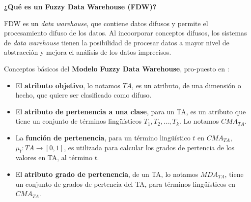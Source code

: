 \documentclass{fancyslides}
\begin{document}
\begin{frame}
\misc
{
\textbf{¿Qué es un Fuzzy Data Warehouse (FDW)?}
\newline

\justifying FDW es un \textit{data warehouse}, que contiene datos difusos y permite el procesamiento difuso de los datos. Al incoorporar conceptos difusos, los sistemas de \textit{data warehouse} tienen la posibilidad de procesar datos a mayor nivel de abstracción y mejora el análisis de los datos imprecisos.
}
\end{frame}


\begin{frame}
\misc
{
\justifying Conceptos básicos del \textbf{Modelo Fuzzy Data Warehouse}, pro-puesto en \cite{Fasel14}:

\begin{itemize}

  \item \justifying El \textbf{atributo objetivo}, lo notamos $TA$, es un atributo, de una dimensión o hecho, que quiere ser clasificado como difuso.

  \item \justifying El \textbf{atributo de pertenencia a una clase}, para un TA, es un atributo que tiene un conjunto de términos lingüísticos $T_{1},T_{2}, \ldots , T_{k}$. Lo notamos $CMA_{TA}$.
\end{itemize}
}
\end{frame}


\begin{frame}
\misc
{
\begin{itemize}

  \item \justifying La \textbf{función de pertenencia}, para un término lingüístico $t$ en $CMA_{TA}$, $\mu_{t} : TA \rightarrow [0,1]$,
  es utilizada para calcular los grados de pertencia de los valores en TA, al término $t$.

  \item \justifying El \textbf{atributo grado de pertenencia}, de un TA, lo notamos $MDA_{TA}$, tiene un conjunto de grados de pertencia del TA,
  para términos lingüísticos en $CMA_{TA}$.
\end{itemize}
}
\end{frame}
\end{document}
